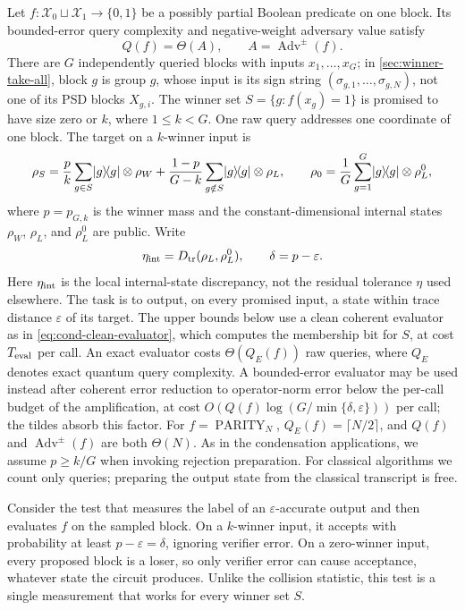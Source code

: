 Let $f:\mathcal X_0\sqcup\mathcal X_1\to\{0,1\}$ be a possibly partial
Boolean predicate on one block.  Its bounded-error query complexity and
negative-weight adversary value satisfy
\[
 Q(f)=\Theta(A),\qquad A=\operatorname{Adv}^{\pm}(f).
\]
There are $G$ independently queried blocks with inputs $x_1,\ldots,x_G$; in
\cref{sec:winner-take-all}, block $g$ is group $g$, whose input is its sign
string $(\sigma_{g,1},\ldots,\sigma_{g,N})$, not one of its PSD blocks
$X_{g,i}$.  The winner set
$S=\{g:f(x_g)=1\}$ is promised to have size zero or $k$, where
$1\le k<G$.  One raw query addresses one coordinate of one block.  The
target on a $k$-winner input is
\begin{equation}
 \rho_S=\frac pk\sum_{g\in S}\lvert g\rangle\!\langle g\rvert\otimes\rho_W
 +\frac{1-p}{G-k}\sum_{g\notin S}\lvert g\rangle\!\langle g\rvert\otimes\rho_L,
 \qquad
 \rho_0=\frac1G\sum_{g=1}^G\lvert g\rangle\!\langle g\rvert\otimes\rho_L^0,
 \label{eq:sc-targets}
\end{equation}
where $p=p_{G,k}$ is the winner mass and the constant-dimensional internal
states $\rho_W$, $\rho_L$, and $\rho_L^0$ are public.
Write
\begin{equation}
 \eta_{\rm int}=D_{\mathrm{tr}}(\rho_L,\rho_L^0),\qquad \delta=p-\varepsilon.
 \label{eq:sc-parameters}
\end{equation}
Here \(\eta_{\rm int}\) is the local internal-state discrepancy, not the
residual tolerance \(\eta\) used elsewhere.
The task is to output, on every promised input, a state within trace distance
$\varepsilon$ of its target.  The upper bounds below use a clean coherent
evaluator as in \eqref{eq:cond-clean-evaluator}, which computes the
membership bit for $S$, at cost $T_{\rm eval}$ per call.  An exact evaluator
costs $\Theta(Q_E(f))$ raw queries, where $Q_E$ denotes exact quantum query
complexity.  A bounded-error evaluator may be used instead after coherent
error reduction to operator-norm error below the per-call budget of the
amplification, at cost
$O(Q(f)\log(G/\min\{\delta,\varepsilon\}))$ per call; the tildes absorb
this factor.  For $f=\operatorname{PARITY}_N$, $Q_E(f)=\lceil N/2\rceil$, and
$Q(f)$ and $\operatorname{Adv}^{\pm}(f)$ are both $\Theta(N)$.  As in the
condensation applications, we assume $p\ge k/G$ when invoking rejection
preparation.
For classical algorithms we count only queries; preparing the output state
from the classical transcript is free.

Consider the test that measures the label of an $\varepsilon$-accurate
output and then evaluates $f$ on the sampled block.  On a $k$-winner input,
it accepts with probability at least $p-\varepsilon=\delta$, ignoring
verifier error.  On a zero-winner input, every proposed block is a loser, so
only verifier error can cause acceptance, whatever state the circuit
produces.  Unlike the collision statistic, this test is a single
measurement that works for every winner set $S$.

